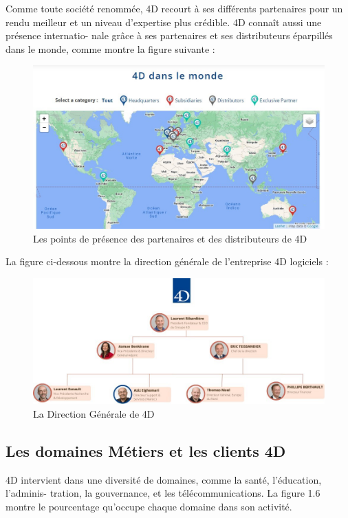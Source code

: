 Comme toute société renommée, 4D recourt à ses différents partenaires 
pour un rendu meilleur et un niveau d’expertise plus crédible. 4D connaît aussi 
une présence internatio- nale grâce à ses partenaires et ses distributeurs éparpillés 
dans le monde, comme montre la figure suivante :

\begin{figure}[h]
    \centering
    \includegraphics[scale=0.6]{Images/carte.jpg} %
    \caption{Les points de présence des partenaires et des distributeurs de 4D}
    \label{fig:carte}
\end{figure}

La figure ci-dessous montre la direction générale de l’entreprise 4D logiciels :

\begin{figure}[h]
    \centering
    \includegraphics[scale=0.6]{Images/direction.jpg} %
    \caption{La Direction Générale de 4D}
    \label{fig:direction}
\end{figure}

\subsection{Les domaines Métiers et les clients 4D}
4D intervient dans une diversité de domaines, comme 
la santé, l’éducation, l’adminis- tration, la gouvernance, 
et les télécommunications. La figure 1.6 montre le pourcentage 
qu’occupe chaque domaine dans son activité.

